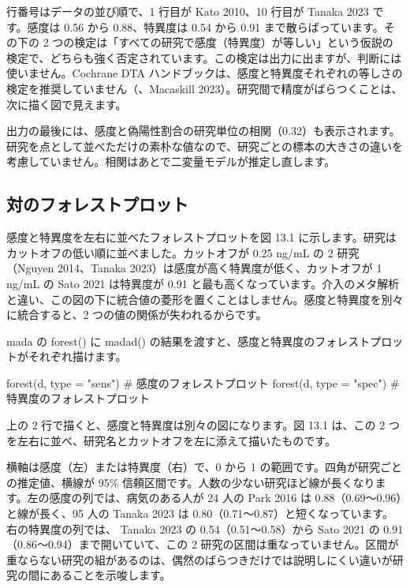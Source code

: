 行番号はデータの並び順で、1 行目が Kato 2010、10 行目が Tanaka 2023 です。感度は 0.56 から 0.88、特異度は 0.54 から 0.91 まで散らばっています。その下の 2 つの検定は「すべての研究で感度（特異度）が等しい」という仮説の検定で、どちらも強く否定されています。この検定は出力に出ますが、判断には使いません。Cochrane DTA ハンドブックは、感度と特異度それぞれの等しさの検定を推奨していません（、Macaskill 2023）。研究間で精度がばらつくことは、次に描く図で見えます。

出力の最後には、感度と偽陽性割合の研究単位の相関（0.32）も表示されます。研究を点として並べただけの素朴な値なので、研究ごとの標本の大きさの違いを考慮していません。相関はあとで二変量モデルが推定し直します。

\subsection{対のフォレストプロット}
\label{sec:13-1-1}

感度と特異度を左右に並べたフォレストプロットを図 13.1 に示します。研究はカットオフの低い順に並べました。カットオフが 0.25 ng/mL の 2 研究（Nguyen 2014、Tanaka 2023）は感度が高く特異度が低く、カットオフが 1 ng/mL の Sato 2021 は特異度が 0.91 と最も高くなっています。介入のメタ解析と違い、この図の下に統合値の菱形を置くことはしません。感度と特異度を別々に統合すると、2 つの値の関係が失われるからです。


mada の forest() に madad() の結果を渡すと、感度と特異度のフォレストプロットがそれぞれ描けます。

\begin{rcode}
forest(d, type = "sens")   # 感度のフォレストプロット
forest(d, type = "spec")   # 特異度のフォレストプロット
\end{rcode}

上の 2 行で描くと、感度と特異度は別々の図になります。図 13.1 は、この 2 つを左右に並べ、研究名とカットオフを左に添えて描いたものです。

横軸は感度（左）または特異度（右）で、0 から 1 の範囲です。四角が研究ごとの推定値、横線が 95\% 信頼区間です。人数の少ない研究ほど線が長くなります。左の感度の列では、病気のある人が 24 人の Park 2016 は 0.88（0.69〜0.96）と線が長く、95 人の Tanaka 2023 は 0.80（0.71〜0.87）と短くなっています。右の特異度の列では、 Tanaka 2023 の 0.54（0.51〜0.58）から Sato 2021 の 0.91（0.86〜0.94）まで開いていて、この 2 研究の区間は重なっていません。区間が重ならない研究の組があるのは、偶然のばらつきだけでは説明しにくい違いが研究の間にあることを示唆します。

